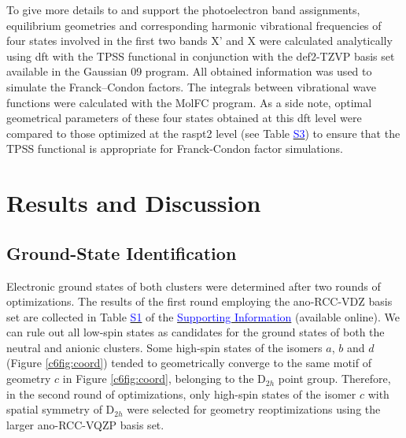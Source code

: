 \begin{refsection}
To give more details to and support the photoelectron band assignments, equilibrium geometries and corresponding harmonic vibrational frequencies of four states involved in the first two bands X' and X were calculated analytically using \acrshort{dft} with the TPSS functional in conjunction with the def2-TZVP basis set \cite{def2-basis} available in the Gaussian 09 program.\cite{g09} All obtained information was used to simulate the Franck–Condon factors. The integrals between vibrational wave functions were calculated with the MolFC program. \cite{MolFC} As a side note, optimal geometrical parameters of these four states obtained at this \acrshort{dft} level were compared to those optimized at the \acrshort{raspt2} level (see Table \href{https://pubs.acs.org/doi/suppl/10.1021/acs.jctc.8b00412/suppl_file/ct8b00412_si_001.pdf}{\textcolor{blue}{S3}}) to ensure that the TPSS functional is appropriate for Franck-Condon factor simulations.  

\section{Results and Discussion}


\subsection{Ground-State Identification}

Electronic ground states of both  clusters were determined after two rounds of optimizations. The results of the first round employing the \acrshort{ano}-RCC-VDZ basis set are collected in Table \href{https://pubs.acs.org/doi/suppl/10.1021/acs.jctc.8b00412/suppl_file/ct8b00412_si_001.pdf}{\textcolor{blue}{S1}} of the \href{https://pubs.acs.org/doi/suppl/10.1021/acs.jctc.8b00412/suppl_file/ct8b00412_si_001.pdf}{\textcolor{blue}{Supporting Information}} (available online). We can rule out all low-spin states as candidates for the ground states of both the neutral and anionic clusters. Some high-spin states of the isomers $\textit{a}$, $\textit{b}$ and $\textit{d}$ (Figure \ref{c6fig:coord}) tended to geometrically converge to the same motif of geometry $\textit{c}$ in Figure \ref{c6fig:coord}, belonging to the D$_{2h}$ point group. Therefore, in the second round of optimizations, only high-spin states of the isomer $c$ with spatial symmetry of D$_{2h}$ were selected for geometry reoptimizations using the larger \acrshort{ano}-RCC-VQZP basis set. 





\end{refsection}
